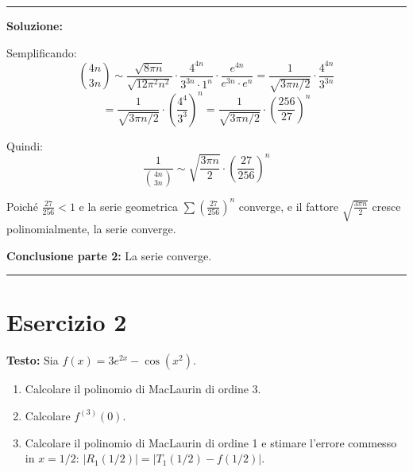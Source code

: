 \documentclass[12pt, a4paper]{article}
\newenvironment{solution}
{\par\noindent\rule{\textwidth}{0.4pt}\par\textbf{Soluzione:}\medskip\par}
{\par\rule{\textwidth}{0.4pt}\par\bigskip}
\begin{document}
\begin{solution}
Semplificando:
\[
\binom{4n}{3n} \sim \frac{\sqrt{8\pi n}}{\sqrt{12\pi^2 n^2}} \cdot \frac{4^{4n}}{3^{3n} \cdot 1^n} \cdot \frac{e^{4n}}{e^{3n} \cdot e^n} = \frac{1}{\sqrt{3\pi n/2}} \cdot \frac{4^{4n}}{3^{3n}}
\]
\[
= \frac{1}{\sqrt{3\pi n/2}} \cdot \left(\frac{4^4}{3^3}\right)^n = \frac{1}{\sqrt{3\pi n/2}} \cdot \left(\frac{256}{27}\right)^n
\]

Quindi:
\[
\frac{1}{\binom{4n}{3n}} \sim \sqrt{\frac{3\pi n}{2}} \cdot \left(\frac{27}{256}\right)^n
\]

Poiché $\frac{27}{256} < 1$ e la serie geometrica $\sum \left(\frac{27}{256}\right)^n$ converge, e il fattore $\sqrt{\frac{3\pi n}{2}}$ cresce polinomialmente, la serie converge.

\textbf{Conclusione parte 2:} La serie converge.
\end{solution}

\newpage

\section*{Esercizio 2}

\textbf{Testo:} Sia $f(x) = 3e^{2x} - \cos(x^{2})$.
\begin{enumerate}
    \item Calcolare il polinomio di MacLaurin di ordine 3.
    \item Calcolare $f^{(3)}(0)$.
    \item Calcolare il polinomio di MacLaurin di ordine 1 e stimare l'errore commesso in $x=1/2$: $|R_{1}(1/2)| = |T_{1}(1/2) - f(1/2)|$.
\end{enumerate}
\end{document}
